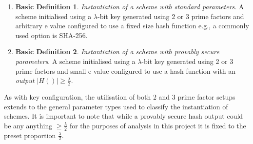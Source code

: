 \documentclass[]{final_report}
\theoremstyle{definition}
\newtheorem{basic}{Basic Definition}
\begin{document}

\begin{enumerate}
    \item[] \begin{basic} 
\textit{Instantiation of a scheme with standard parameters}. A scheme initialised using a $\lambda$-bit key generated using 2 or 3 prime factors and arbitrary e value configured to use a fixed size hash function e.g., a commonly used option is SHA-256.
\end{basic}
    \item[] \begin{basic}
\textit{Instantiation of a scheme with provably secure parameters}. A scheme initialised using a $\lambda$-bit key generated using 2 or 3 prime factors and small e value configured to use a hash function with an \textit{output $\displaystyle|H()| \geq \displaystyle\frac{\lambda}{2}$}.
\end{basic}

\end{enumerate}
As with key configuration, the utilisation of both 2 and 3 prime factor setups extends to the general parameter types used to classify the instantiation of schemes. It is important to note that while a provably secure hash output could be any anything \( \geq \frac{\lambda}{2} \) for the purposes of analysis in this project it is fixed to the preset proportion \( \frac{\lambda}{2} \).
\end{document}
